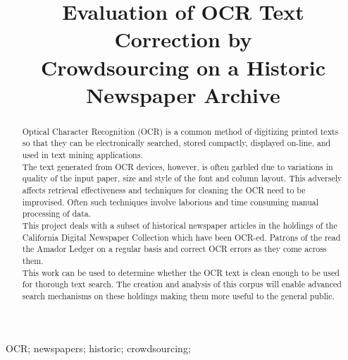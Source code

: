 \title{Evaluation of OCR Text Correction by\\
	 Crowdsourcing on a Historic Newspaper Archive}

\author{
}

\maketitle

\begin{abstract}

Optical Character Recognition (OCR) is a common method of digitizing printed texts so that they can be electronically searched, stored compactly, displayed on-line, and used in text mining applications.\\
The text generated from OCR devices, however, is often garbled due to variations in quality of the input paper, size and style of the font and column layout. This adversely affects retrieval effectiveness and techniques for cleaning the OCR need to be improvised. Often such techniques involve laborious and time consuming manual processing of data.\\
This project deals with a subset of historical newspaper articles in the holdings of the California Digital Newspaper Collection \cite{cdnc} which have been OCR-ed. Patrons of the \cite{cdnc} read the Amador Ledger on a regular basis and correct OCR errors as they come across them.\\
This work can be used to determine whether the OCR text is clean enough to be used for thorough text search. The creation and analysis of this corpus will enable advanced search mechanisms on these holdings making them more
useful to the general public.\\

\end{abstract}

\begin{IEEEkeywords}
OCR; newspapers; historic; crowdsourcing;
\end{IEEEkeywords}

